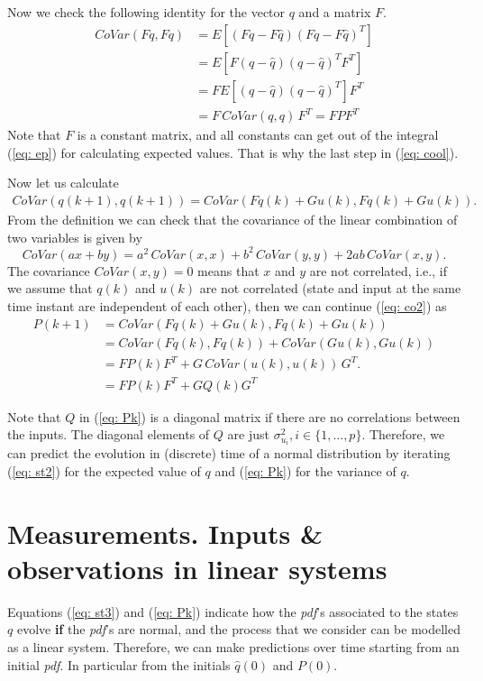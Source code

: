 \documentclass[11pt,a4paper]{article}
\begin{document}
Now we check the following identity for the vector $q$ and a matrix $F$.
\begin{align}
	CoVar(Fq,Fq) &= E[(Fq-F\hat q)(Fq-F\hat q)^T] \nonumber \\
	&= E[F(q-\hat q)(q -\hat q)^TF^T] \nonumber \\
	&= F E[(q-\hat q)(q -\hat q)^T] F^T \nonumber \\
	&= F \, CoVar(q,q) \, F^T = F P F^T \label{eq: cool}
\end{align}
Note that $F$ is a constant matrix, and all constants can get out of the integral (\ref{eq: ep}) for calculating expected values. That is why the last step in (\ref{eq: cool}).

Now let us calculate
\begin{align}
	CoVar(q(k+1), q(k+1)) = CoVar(Fq(k)+Gu(k),Fq(k)+Gu(k)).
	\label{eq: co2}
\end{align}
From the definition we can check that the covariance of the linear combination of two variables is given by
\begin{equation}
	CoVar(ax + by) = a^2\,CoVar(x,x) + b^2\, CoVar(y,y) + 2ab \, CoVar(x,y).
\end{equation}
The covariance $CoVar(x,y) = 0$ means that $x$ and $y$ are not correlated, i.e., if we assume that $q(k)$ and $u(k)$ are not correlated (state and input at the same time instant are independent of each other), then we can continue (\ref{eq: co2}) as
\begin{align}
	P(k+1) &= CoVar(Fq(k)+Gu(k),Fq(k)+Gu(k)) \nonumber \\
	&= CoVar(Fq(k),Fq(k)) + CoVar(Gu(k),Gu(k)) \nonumber \\
	&= FP(k)F^T + G\,CoVar(u(k),u(k))\,G^T. \nonumber \\
	&= FP(k)F^T + GQ(k)G^T\label{eq: Pk}
\end{align}

Note that $Q$ in (\ref{eq: Pk}) is a diagonal matrix if there are no correlations between the inputs. The diagonal elements of $Q$ are just $\sigma^2_{u_i}, i\in\{1,\dots,p\}$. Therefore, we can predict the evolution in (discrete) time of a normal distribution by iterating (\ref{eq: st2}) for the expected value of $q$ and (\ref{eq: Pk}) for the variance of $q$.

\section{Measurements. Inputs \& observations in linear systems}
Equations (\ref{eq: st3}) and (\ref{eq: Pk}) indicate how the \emph{pdf}'s associated to the states $q$ evolve \textbf{if} the \emph{pdf}'s are normal, and the process that we consider can be modelled as a linear system. Therefore, we can make predictions over time starting from an initial \emph{pdf}. In particular from the initials $\hat q(0)$ and $P(0)$.
\end{document}
